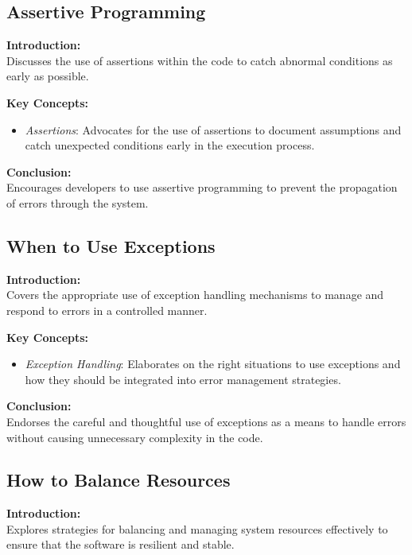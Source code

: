 \subsection{Assertive Programming}

\textbf{Introduction:} \\
Discusses the use of assertions within the code to catch abnormal conditions as early as possible.

\vspace{2mm}
\noindent\textbf{Key Concepts:}
\begin{itemize}
  \item \textit{Assertions}: Advocates for the use of assertions to document assumptions and catch unexpected conditions early in the execution process.
\end{itemize}

\vspace{2mm}
\noindent\textbf{Conclusion:} \\
Encourages developers to use assertive programming to prevent the propagation of errors through the system.

\subsection{When to Use Exceptions}

\textbf{Introduction:} \\
Covers the appropriate use of exception handling mechanisms to manage and respond to errors in a controlled manner.

\vspace{2mm}
\noindent\textbf{Key Concepts:}
\begin{itemize}
  \item \textit{Exception Handling}: Elaborates on the right situations to use exceptions and how they should be integrated into error management strategies.
\end{itemize}

\vspace{2mm}
\noindent\textbf{Conclusion:} \\
Endorses the careful and thoughtful use of exceptions as a means to handle errors without causing unnecessary complexity in the code.

\subsection{How to Balance Resources}

\textbf{Introduction:} \\
Explores strategies for balancing and managing system resources effectively to ensure that the software is resilient and stable.

